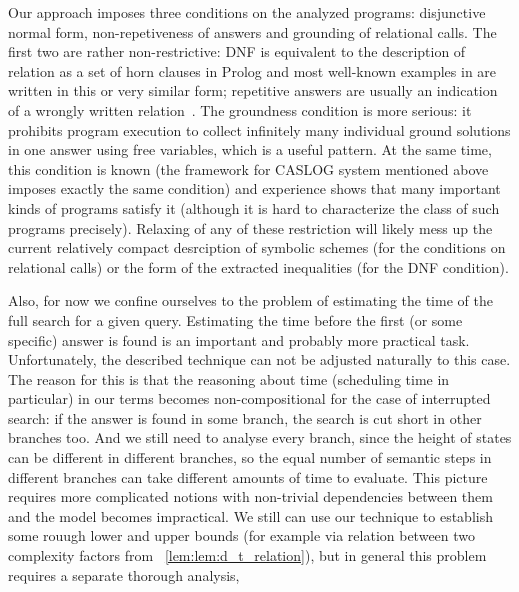 Our approach imposes three conditions on the analyzed programs: disjunctive normal form, non-repetiveness of answers and grounding of relational calls. The first two are rather non-restrictive: DNF is equivalent to the description of relation as a set of horn clauses in Prolog and most well-known examples in \mK are written in this or very similar form; repetitive answers are usually an indication of a wrongly written relation~\cite{WillsThesis}. The groundness condition is more serious: it prohibits program execution to collect infinitely many individual ground solutions in one answer using free variables, which is a useful pattern. At the same time, this condition is known (the framework for CASLOG system mentioned above imposes exactly the same condition) and experience shows that many important kinds of programs satisfy it (although it is hard to characterize the class of such programs precisely). Relaxing of any of these restriction will likely mess up the current relatively compact desrciption of symbolic schemes (for the conditions on relational calls) or the form of the extracted inequalities (for the DNF condition).

Also, for now we confine ourselves to the problem of estimating the time of the full search for a given query. Estimating the time before the first (or some specific) answer is found is an important and probably more practical task. Unfortunately, the described technique can not be adjusted naturally to this case. The reason for this is that the reasoning about time (scheduling time in particular) in our terms becomes non-compositional for the case of interrupted search: if the answer is found in some branch, the search is cut short in other branches too. And we still need to analyse every branch, since the height of states can be different in different branches, so the equal number of semantic steps in different branches can take different amounts of time to evaluate. This picture requires more complicated notions with non-trivial dependencies between them and the model becomes impractical. We still can use our technique to establish some rouugh lower and upper bounds (for example via relation between two complexity factors from \lemmaword~\ref{lem:lem:d_t_relation}), but in general this problem requires a separate thorough analysis,

